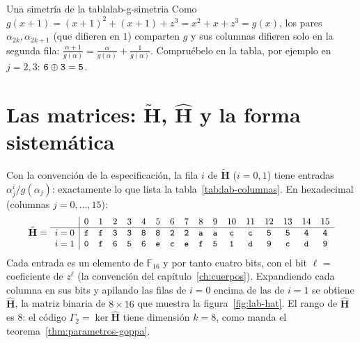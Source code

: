 \documentclass[11pt,a4paper,oneside]{report}
\newcommand{\GF}[1]{\mathbb{F}_{#1}}
\newcommand{\Hmat}{\mathbf{H}}          %
\newcommand{\hx}[1]{\text{\texttt{#1}}}
\begin{document}
\begin{observacion}{Una simetría de la tabla}{lab-g-simetria}
Como $g(x+1)=(x+1)^2+(x+1)+z^3=x^2+x+z^3=g(x)$, los pares
$\alpha_{2k},\alpha_{2k+1}$ (que difieren en $1$) comparten $g$ y sus
columnas difieren solo en la segunda fila:
$\frac{\alpha+1}{g(\alpha)}=\frac{\alpha}{g(\alpha)}+\frac1{g(\alpha)}$.
Compruébelo en la tabla, por ejemplo en $j=2,3$:
$\hx 6\oplus\hx 3=\hx 5$.
\end{observacion}

\section{Las matrices: $\tilde{\Hmat}$, $\hat{\Hmat}$ y la forma sistemática}

Con la convención de la especificación, la fila $i$ de $\tilde{\Hmat}$
($i=0,1$) tiene entradas $\alpha_j^i/g(\alpha_j)$: exactamente lo que
lista la tabla~\ref{tab:lab-columnas}. En hexadecimal (columnas
$j=0,\dots,15$):
\[
{\small
\tilde{\Hmat}=
\begin{array}{c|cccccccccccccccc}
 & 0&1&2&3&4&5&6&7&8&9&10&11&12&13&14&15\\\hline
i=0 & \hx{f}&\hx{f}&\hx{3}&\hx{3}&\hx{8}&\hx{8}&\hx{2}&\hx{2}&\hx{a}&\hx{a}&\hx{c}&\hx{c}&\hx{5}&\hx{5}&\hx{4}&\hx{4}\\
i=1 & \hx{0}&\hx{f}&\hx{6}&\hx{5}&\hx{6}&\hx{e}&\hx{c}&\hx{e}&\hx{f}&\hx{5}&\hx{1}&\hx{d}&\hx{9}&\hx{c}&\hx{d}&\hx{9}
\end{array}}
\]
Cada entrada es un elemento de $\GF{16}$ y por tanto cuatro bits, con el
bit $\ell$ = coeficiente de $z^\ell$ (la convención del
capítulo~\ref{ch:cuerpos}). Expandiendo cada columna en sus bits y
apilando las filas de $i=0$ encima de las de $i=1$ se obtiene
$\hat{\Hmat}$, la matriz binaria de $8\times16$ que muestra la
figura~\ref{fig:lab-hat}. El rango de $\hat{\Hmat}$ es $8$: el código
$\Gamma_2=\ker\hat{\Hmat}$ tiene dimensión $k=8$, como manda el
teorema~\ref{thm:parametros-goppa}.
\end{document}
